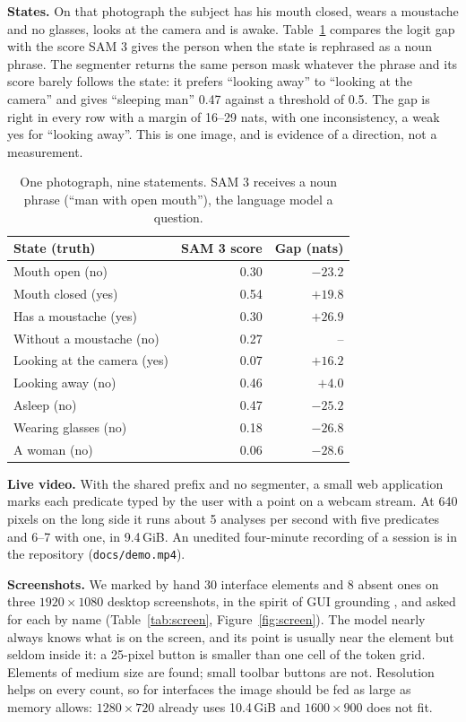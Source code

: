 \documentclass[10pt,twocolumn]{article}
\begin{document}
\textbf{States.} On that photograph the subject has his mouth closed, wears a
moustache and no glasses, looks at the camera and is awake.
Table~\ref{tab:states} compares the logit gap with the score SAM 3 gives the
person when the state is rephrased as a noun phrase. The segmenter returns the
same person mask whatever the phrase and its score barely follows the state:
it prefers ``looking away'' to ``looking at the camera'' and gives ``sleeping
man'' 0.47 against a threshold of 0.5. The gap is right in every row with a
margin of 16--29 nats, with one inconsistency, a weak yes for ``looking
away''. This is one image, and is evidence of a direction, not a measurement.

\begin{table}[t]
\centering\small
\setlength{\tabcolsep}{4pt}
\begin{tabular}{lrr}
\toprule
State (truth) & SAM 3 score & Gap (nats) \\
\midrule
Mouth open (no) & 0.30 & $-23.2$ \\
Mouth closed (yes) & 0.54 & $+19.8$ \\
Has a moustache (yes) & 0.30 & $+26.9$ \\
Without a moustache (no) & 0.27 & -- \\
Looking at the camera (yes) & 0.07 & $+16.2$ \\
Looking away (no) & 0.46 & $+4.0$ \\
Asleep (no) & 0.47 & $-25.2$ \\
Wearing glasses (no) & 0.18 & $-26.8$ \\
A woman (no) & 0.06 & $-28.6$ \\
\bottomrule
\end{tabular}
\caption{One photograph, nine statements. SAM 3 receives a noun phrase (``man
with open mouth''), the language model a question.}
\label{tab:states}
\end{table}

\textbf{Live video.} With the shared prefix and no segmenter, a small web
application marks each predicate typed by the user with a point on a webcam
stream. At 640 pixels on the long side it runs about 5 analyses per second
with five predicates and 6--7 with one, in 9.4\,GiB. An unedited four-minute
recording of a session is in the repository (\texttt{docs/demo.mp4}).

\textbf{Screenshots.} We marked by hand 30 interface elements and 8 absent
ones on three $1920\times1080$ desktop screenshots, in the spirit of GUI
grounding \cite{cheng2024seeclick}, and asked for each by name
(Table~\ref{tab:screen}, Figure~\ref{fig:screen}). The model nearly always
knows what is on the screen, and its point is usually near the element but
seldom inside it: a 25-pixel button is smaller than one cell of the token
grid. Elements of medium size are found; small toolbar buttons are not.
Resolution helps on every count, so for interfaces the image should be fed as
large as memory allows: $1280\times720$ already uses 10.4\,GiB and
$1600\times900$ does not fit.
\end{document}

